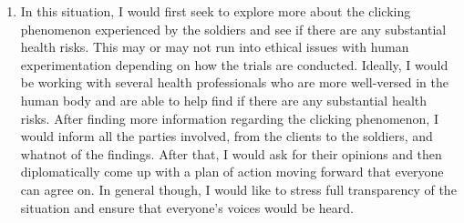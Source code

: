\documentclass[12pt]{article}
\begin{document}
\begin{enumerate}
\begin{enumerate}
\begin{enumerate}
			\item [(iii)]
			In this situation, I would first seek to explore more about the clicking phenomenon experienced by the soldiers and see if there are any substantial health risks.
			This may or may not run into ethical issues with human experimentation depending on how the trials are conducted.
			Ideally, I would be working with several health professionals who are more well-versed in the human body and are able to help find if there are any substantial health risks.
			After finding more information regarding the clicking phenomenon, I would inform all the parties involved, from the clients to the soldiers, and whatnot of the findings.
			After that, I would ask for their opinions and then diplomatically come up with a plan of action moving forward that everyone can agree on.
			In general though, I would like to stress full transparency of the situation and ensure that everyone's voices would be heard.
		\end{enumerate}



	\end{enumerate}
	

			
\end{enumerate}

		
\end{document}
